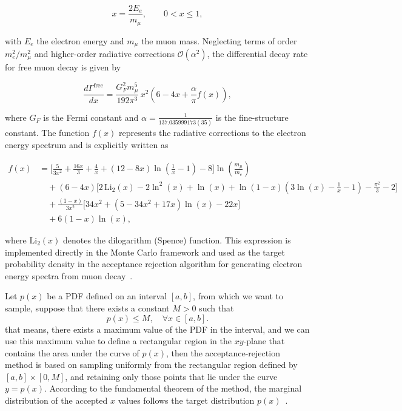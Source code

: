 \documentclass[letterpaper,10pt]{article}
\begin{document}
\[
x = \frac{2E_e}{m_\mu},
\qquad 0 < x \leq 1,
\]

with \(E_e\) the electron energy and \(m_\mu\) the muon mass. Neglecting terms of order \(m_e^2/m_\mu^2\) and higher-order radiative corrections \(\mathcal{O}(\alpha^2)\), the differential decay rate for free muon decay is given by

\[
\frac{d\Gamma^{\mathrm{free}}}{dx}
=
\frac{G_F^2 m_\mu^5}{192\pi^3}
\,x^2
\left(
6 - 4x + \frac{\alpha}{\pi} f(x)
\right),
\]

where \(G_F\) is the Fermi constant and $\alpha = \frac{1}{137.035999173(35)}$ is the fine-structure constant. The function \(f(x)\) represents the radiative corrections to the electron energy spectrum and is explicitly written as

\[
\begin{aligned}
f(x)
&=
\Bigg[
\frac{5}{3x^2}
+
\frac{16x}{3}
+
\frac{4}{x}
+
(12 - 8x)
\ln\!\left(\frac{1}{x} - 1\right)
- 8
\Bigg]
\ln\!\left(\frac{m_\mu}{m_e}\right)
\\[1em]
&\quad
+
(6 - 4x)
\Bigg[
2\,\mathrm{Li}_2(x)
- 2\ln^2(x)
+ \ln(x)
+
\ln(1-x)
\left(
3\ln(x)
-
\frac{1}{x}
-
1
\right)
-
\frac{\pi^2}{3}
-
2
\Bigg]
\\[1em]
&\quad
+
\frac{(1-x)}{3x^2}
\Big[
34x^2
+
(5 - 34x^2 + 17x)\ln(x)
-
22x
\Big]
\\[1em]
&\quad
+
6(1-x)\ln(x),
\end{aligned}
\]

where \(\mathrm{Li}_2(x)\) denotes the dilogarithm (Spence) function. This expression is implemented directly in the Monte Carlo framework and used as the target probability density in the acceptance rejection algorithm for generating electron energy spectra from muon decay~\parencite{Czarnecki_2014}.

Let $p(x)$ be a PDF defined on an interval $[a,b]$, from which we want to sample, suppose that there exists a constant $M > 0$ such that
\begin{equation}
    p(x) \leq M, \quad \forall x \in [a,b].
\end{equation}
that means, there exists a maximum value of the PDF in the interval, and we can use this maximum value to define a rectangular region in the $xy$-plane that contains the area under the curve of $p(x)$, then the acceptance-rejection method is based on sampling uniformly from the rectangular region defined by $[a,b] \times [0,M]$, and retaining only those points that lie under the curve $y = p(x)$. According to the fundamental theorem of the method, the marginal distribution of the accepted $x$ values follows the target distribution $p(x)$~\parencite{Nakade_2025}.
\end{document}
